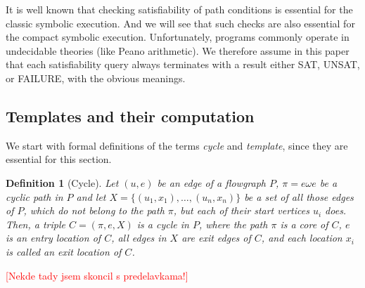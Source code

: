 \documentclass{sig-alternate}%
\newtheorem{dfn}{Definition}%
\newcommand{\todo}[1]{{\scriptsize{{\textcolor{red}{[#1]}}}}}
\begin{document}
\smallskip It is well known that checking satisfiability of path conditions
is essential for the classic symbolic execution. And we will see that such
checks are also essential for the compact symbolic execution. Unfortunately,
programs commonly operate in undecidable theories (like Peano
arithmetic). We therefore assume in this paper that each satisfiability
query always terminates with a result either SAT, UNSAT, or FAILURE, with
the obvious meanings.



\subsection{Templates and their computation}

We start with formal definitions of the terms \emph{cycle} and
\emph{template}, since they are essential for this section.

\begin{dfn}[Cycle]\label{def:Part}
Let $(u,e)$ be an edge of a flowgraph $P$, $\pi = e \omega e$
be a cyclic path in $P$
and let $X = \{ (u_1,x_1), \ldots, (u_n,x_n) \}$ be a %
set of all those edges of $P$, which do not belong to the path $\pi$, but
each of their start vertices $u_i$ does. Then, a triple $C = (\pi, e, X) $
is a \emph{cycle} in $P$, where the path $\pi$ is a \emph{core} of $C$, $e$
is an \emph{entry location} of $C$, all edges in $X$ are \emph{exit edges}
of $C$, and each location $x_i$ is called an \emph{exit location} of $C$.
\end{dfn}

\todo{Nekde tady jsem skoncil s predelavkama!}
\end{document}
